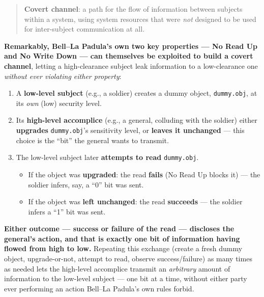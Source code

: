 \documentclass[12pt, a4paper]{article}
\begin{document}
\begin{quote}
\textcolor{red!70!black}{\textbf{Covert channel}}: a path for the flow of information between subjects within a system, using system resources that were \emph{not} designed to be used for inter-subject communication at all.
\end{quote}
\textcolor{blue!50!black}{\textbf{Remarkably, Bell--La Padula's own two key properties --- No Read Up and No Write Down --- can themselves be exploited to build a covert channel}}, letting a high-clearance subject leak information to a low-clearance one \emph{without ever violating either property}:
\begin{enumerate}
    \item A \textbf{low-level subject} (e.g., a soldier) creates a dummy object, \texttt{dummy.obj}, at its \emph{own} (low) security level.
    \item Its \textbf{high-level accomplice} (e.g., a general, colluding with the soldier) either \textbf{upgrades} \texttt{dummy.obj}'s sensitivity level, or \textbf{leaves it unchanged} --- this choice is the ``bit'' the general wants to transmit.
    \item The low-level subject later \textbf{attempts to read} \texttt{dummy.obj}.
    \begin{itemize}
        \item If the object was \textbf{upgraded}: the read \textbf{fails} (No Read Up blocks it) --- the soldier infers, say, a ``0'' bit was sent.
        \item If the object was \textbf{left unchanged}: the read \textbf{succeeds} --- the soldier infers a ``1'' bit was sent.
    \end{itemize}
\end{enumerate}
\textcolor{red!70!black}{\textbf{Either outcome --- success or failure of the read --- discloses the general's action, and that is exactly one bit of information having flowed from high to low.}} Repeating this exchange (create a fresh dummy object, upgrade-or-not, attempt to read, observe success/failure) as many times as needed lets the high-level accomplice transmit an \emph{arbitrary} amount of information to the low-level subject --- one bit at a time, without either party ever performing an action Bell--La Padula's own rules forbid.
\end{document}
